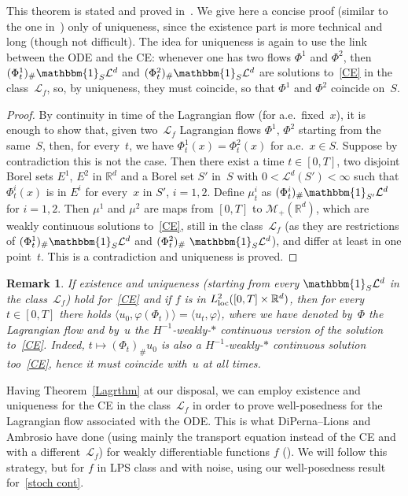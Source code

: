 \documentclass[a4paper,10pt]{article}
\newtheorem{remark}[theorem]{Remark}
\newcommand\1{\mathbbm{1}}
\newcommand{\mr}{\mathbb{R}}
\newcommand{\mc}{\mathcal}
\newcommand{\lan}{\langle}
\newcommand{\ran}{\rangle}
\newcommand\loc{{\rm loc}}
\numberwithin{equation}{section}
\begin{document}
This theorem is stated and proved in~\cite[Theorem 18]{AMBCRI08}. We give here a concise proof (similar to the one in~\cite{AMBCRI08}) only of uniqueness, since the existence part is more technical and long (though not difficult). The idea for uniqueness is again to use the link between the ODE and the CE: whenever one has two flows $\Phi^1$ and $\Phi^2$, then $(\Phi^1_t)_\# \1_S \mc{L}^d$ and $(\Phi^2_t)_\# \1_S \mc{L}^d$ are solutions to~\eqref{CE} in the class~$\mc{L}_f$, so, by uniqueness, they must coincide, so that $\Phi^1$ and $\Phi^2$ coincide on~$S$.

\begin{proof}
By continuity in time of the Lagrangian flow (for a.e.~fixed~$x$), it is enough to show that, given two~$\mc{L}_f$ Lagrangian flows $\Phi^1$, $\Phi^2$ starting from the same~$S$, then, for every~$t$, we have $\Phi^1_t(x)=\Phi^2_t(x)$ for a.e.~$x \in S$. Suppose by contradiction this is not the case. Then there exist a time $t \in [0,T]$, two disjoint Borel sets $E^1$, $E^2$ in $\mr^d$ and a Borel set $S'$ in~$S$ with $0<\mc{L}^d(S')<\infty$ such that $\Phi_t^i(x)$ is in $E^i$ for every~$x$ in $S'$, $i=1,2$. Define $\mu^i_t$ as $(\Phi^i_t)_\# \1_{S'} \mc{L}^d$ for $i=1,2$. Then $\mu^1$ and $\mu^2$ are maps from $[0,T]$ to $\mc{M}_+(\mr^d)$, which are weakly continuous solutions to~\eqref{CE}, still in the class~$\mc{L}_f$ (as they are restrictions of $(\Phi^1_t)_\# \1_S \mc{L}^d$ and $(\Phi^2_t)_\# \ \1_S \mc{L}^d$), and differ at least in one point~$t$. This is a contradiction and uniqueness is proved.
\end{proof}

\begin{remark}\label{lagr_repr}
If existence and uniqueness \textup{(}starting from every $ \1_S \mc{L}^d$ in the class~$\mc{L}_f$\textup{)} hold for~\eqref{CE} and if $f$ is in $L^2_{\loc}([0,T]\times\mr^d)$, then for every~$t \in [0,T]$ there holds $\lan u_0,\varphi(\Phi_t)\ran = \lan u_t,\varphi\ran$, where we have denoted by~$\Phi$ the Lagrangian flow and by~$u$ the $H^{-1}$-weakly-$*$ continuous version of the solution to~\eqref{CE}. Indeed, $t\mapsto (\Phi_t)_\#u_0$ is also a $H^{-1}$-weakly-$*$ continuous solution too~\eqref{CE}, hence it must coincide with~$u$ at all times.
\end{remark}

Having Theorem~\ref{Lagrthm} at our disposal, we can employ existence and uniqueness for the CE in the class~$\mc{L}_f$ in order to prove well-posedness for the Lagrangian flow associated with the ODE. This is what DiPerna--Lions and Ambrosio have done (using mainly the transport equation instead of the CE and with a different~$\mc{L}_f$) for weakly differentiable functions $f$ (\cite{DIPELI89,AMBROSIO04}). We will follow this strategy, but for $f$ in LPS class and with noise, using our well-posedness result for~\eqref{stoch cont}. 
\end{document}

